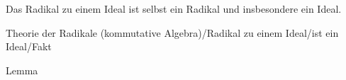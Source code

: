 Das Radikal zu einem Ideal ist selbst ein Radikal und insbesondere ein Ideal.




{Theorie der Radikale (kommutative Algebra)/Radikal zu einem Ideal/ist ein Ideal/Fakt}


{Lemma}


{}


{


\faktsituation {}






\faktzusatz {}


\faktzusatz {}


}


